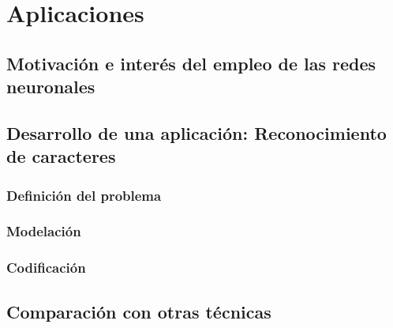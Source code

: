 \chapter{Aplicaciones}
\label{cha:resolucion}

\section{Motivación e interés del empleo de las redes neuronales}


\section{Desarrollo de una aplicación: Reconocimiento de caracteres}


\subsection{Definición del problema}


\subsection{Modelación}


\subsection{Codificación}

\section{Comparación con otras técnicas}
